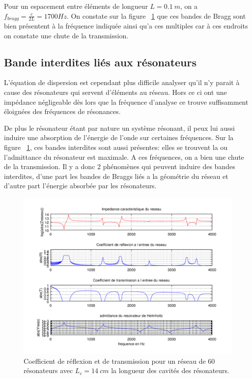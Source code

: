 Pour un espacement entre éléments de longueur $L=0.1~m$, on a $f_{bragg} = \frac{c}{2L} = 1700 Hz$. On constate sur la figure ~\ref{ex_coef_RT} que ces bandes de Bragg sont bien présentent à la fréquence indiquée ainsi qu'a ces multiples car à ces endroits on constate une chute de la transmission.
 

\subsection{Bande interdites liés aux résonateurs}
L'équation de dispersion est cependant plus difficile analyser qu'il n'y parait à cause des résonateurs qui servent d’éléments au réseau. Hors ce ci ont une impédance négligeable dès lors que la fréquence d'analyse ce trouve suffisamment éloignées des fréquences de résonances. 

De plus le résonateur étant par nature un système résonant, il peux lui aussi induire une absorption de l'énergie de l'onde sur certaines fréquences. Sur la figure ~\ref{ex_coef_RT}, ces bandes interdites sont aussi présentes: elles se trouvent la ou l'admittance du résonateur est maximale. A ces fréquences, on a bien une chute de la transmission.
 \bigskip
Il y a donc 2 phénomènes qui peuvent induire des bandes interdites, d'une part les bandes de Braggs liés a la géométrie du réseau et d'autre part l'énergie absorbée par les résonateurs.

\begin{figure}
\centering
\includegraphics[scale=0.5]{./images_chp1/ex_coef_rapport.png}
\caption{\label{ex_coef_RT} Coefficient de réflexion et de transmission pour un réseau de 60 résonateurs avec $L_c=14~cm$ la longueur des cavités des résonateurs.}
\end{figure}


